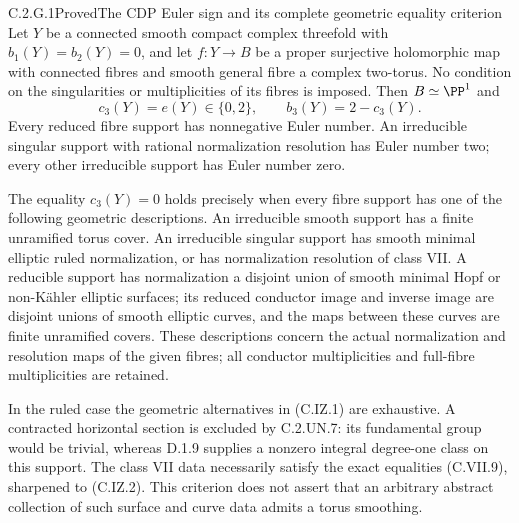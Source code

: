 \begin{statement}{C.2.G.1}{Proved}{The CDP Euler sign and its complete geometric equality criterion}
Let $Y$ be a connected smooth compact complex threefold with
$b_1(Y)=b_2(Y)=0$, and let $f:Y\to B$ be a proper surjective
holomorphic map with connected fibres and smooth general fibre a
complex two-torus. No condition on the singularities or
multiplicities of its fibres is imposed. Then $B\simeq\PP^1$ and
\[
 c_3(Y)=e(Y)\in\{0,2\},\qquad b_3(Y)=2-c_3(Y).       \tag{C.G.1}
\]
Every reduced fibre support has nonnegative Euler number.
An irreducible singular support with rational normalization
resolution has Euler number two; every other irreducible support
has Euler number zero.

The equality $c_3(Y)=0$ holds precisely when every fibre support
has one of the following geometric descriptions. An irreducible
smooth support has a finite unramified torus cover. An irreducible
singular support has smooth minimal elliptic ruled normalization,
or has normalization resolution of class VII. A reducible support has
normalization a disjoint union of smooth minimal Hopf or
non-K\"ahler elliptic surfaces; its reduced conductor image and
inverse image are disjoint unions of smooth elliptic curves,
and the maps between these curves are finite unramified covers.
These descriptions concern the actual normalization and
resolution maps of the given fibres; all conductor multiplicities
and full-fibre multiplicities are retained.

In the ruled case the geometric alternatives in (C.IZ.1) are
exhaustive. A contracted horizontal section is excluded by
C.2.UN.7: its fundamental group would be trivial, whereas
D.1.9 supplies a nonzero integral degree-one class on this
support. The class VII data necessarily satisfy the exact
equalities (C.VII.9), sharpened to (C.IZ.2). This criterion
does not assert that an arbitrary abstract collection of such
surface and curve data admits a torus smoothing.
\end{statement}
